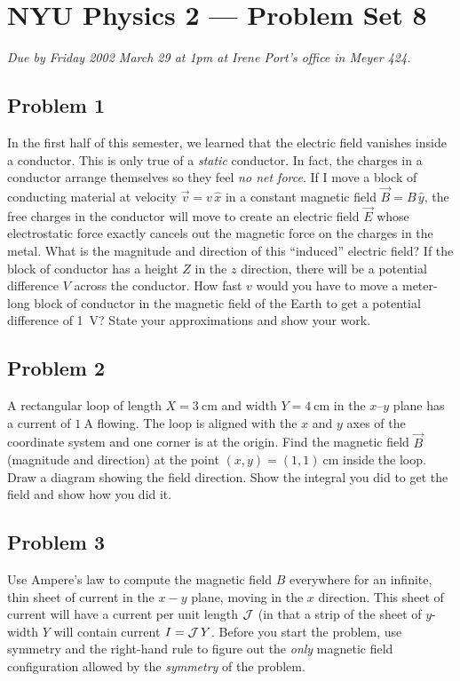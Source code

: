 \documentclass{article}
\begin{document}
\thispagestyle{empty}
\section*{NYU Physics 2 --- Problem Set 8}

\emph{Due by Friday 2002 March 29 at 1pm at Irene Port's office in
Meyer 424.}

\subsection*{Problem 1}

In the first half of this semester, we learned that the electric field
vanishes inside a conductor.  This is only true of a \emph{static}
conductor.  In fact, the charges in a conductor arrange themselves so
they feel \emph{no net force}.  If I move a block of conducting
material at velocity $\vec{v}=v\,\hat{x}$ in a constant magnetic field
$\vec{B}=B\,\hat{y}$, the free charges in the conductor will move to
create an electric field $\vec{E}$ whose electrostatic force exactly
cancels out the magnetic force on the charges in the metal.  What is
the magnitude and direction of this ``induced'' electric field?  If
the block of conductor has a height $Z$ in the $z$ direction, there
will be a potential difference $V$ across the conductor.  How fast $v$
would you have to move a meter-long block of conductor in the magnetic
field of the Earth to get a potential difference of 1~V?  State your
approximations and show your work.

\subsection*{Problem 2}

A rectangular loop of length $X=3~\mathrm{cm}$ and width
$Y=4~\mathrm{cm}$ in the $x$--$y$ plane has a current of
$1~\mathrm{A}$ flowing.  The loop is aligned with the $x$ and $y$ axes
of the coordinate system and one corner is at the origin.  Find the
magnetic field $\vec{B}$ (magnitude and direction) at the point
$(x,y)=(1,1)~\mathrm{cm}$ inside the loop.  Draw a diagram showing the
field direction.  Show the integral you did to get the field and show
how you did it.

\subsection*{Problem 3}

Use Ampere's law to compute the magnetic field $B$ everywhere for an
infinite, thin sheet of current in the $x-y$ plane, moving in the $x$
direction.  This sheet of current will have a current per unit length
$\cal J$ (in that a strip of the sheet of $y$-width $Y$ will contain
current $I= {\cal J}\,Y$.  Before you start the problem, use symmetry
and the right-hand rule to figure out the \emph{only} magnetic field
configuration allowed by the \emph{symmetry} of the problem.
\end{document}
